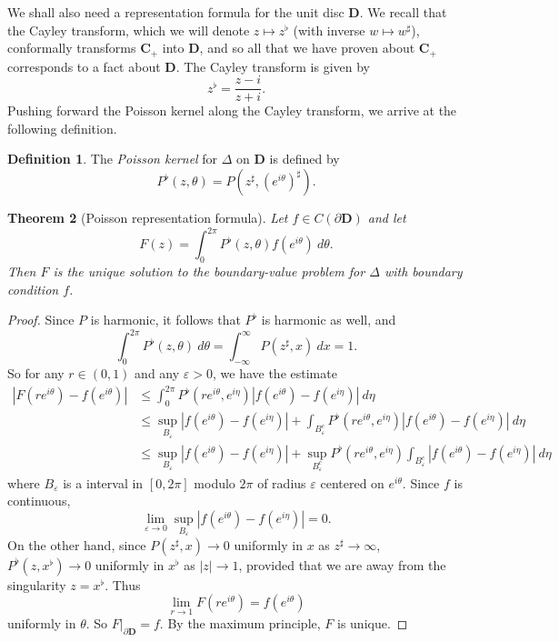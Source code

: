 \documentclass[12pt]{report}
\newcommand{\CC}{\mathbf{C}}
\newcommand{\DD}{\mathbf{D}}
\newcommand{\dfn}[1]{\emph{#1}\index{#1}}
\newtheorem{theorem}{Theorem}[chapter]
\theoremstyle{definition}
\newtheorem{definition}[theorem]{Definition}
\theoremstyle{remark}
\begin{document}
We shall also need a representation formula for the unit disc $\DD$. We recall that the Cayley transform, which we will denote $z \mapsto z^\flat$ (with inverse $w \mapsto w^\sharp$), conformally transforms $\CC_+$ into $\DD$, and so all that we have proven about $\CC_+$ corresponds to a fact about $\DD$. The Cayley transform is given by
$$z^\flat = \frac{z - i}{z + i}.$$
Pushing forward the Poisson kernel along the Cayley transform, we arrive at the following definition.
\begin{definition}
The \dfn{Poisson kernel} for $\Delta$ on $\DD$ is defined by
$$P^\flat(z, \theta) = P(z^\sharp, (e^{i\theta})^\sharp).$$
\end{definition}
\begin{theorem}[Poisson representation formula]
Let $f \in C(\partial \DD)$ and let
$$F(z) = \int_0^{2\pi} P^\flat(z, \theta)f(e^{i\theta}) ~d\theta.$$
Then $F$ is the unique solution to the boundary-value problem for $\Delta$ with boundary condition $f$.
\end{theorem}
\begin{proof}
Since $P$ is harmonic, it follows that $P^\flat$ is harmonic as well, and
$$\int_0^{2\pi} P^\flat(z, \theta) ~d\theta = \int_{-\infty}^\infty P(z^\sharp, x) ~dx = 1.$$
So for any $r \in (0, 1)$ and any $\varepsilon > 0$, we have the estimate
\begin{align*}
  |F(re^{i\theta}) - f(e^{i\theta})| &\leq \int_0^{2\pi} P^\flat(re^{i\theta}, e^{i\eta})|f(e^{i\theta}) - f(e^{i\eta})| ~d\eta\\
    &\leq \sup_{B_\varepsilon} |f(e^{i\theta}) - f(e^{i\eta})| + \int_{B_\varepsilon^c} P^\flat(re^{i\theta}, e^{i\eta})|f(e^{i\theta}) - f(e^{i\eta})| ~d\eta\\
    &\leq \sup_{B_\varepsilon} |f(e^{i\theta}) - f(e^{i\eta})| + \sup_{B_\varepsilon^c} P^\flat(re^{i\theta}, e^{i\eta}) \int_{B_\varepsilon^c} |f(e^{i\theta}) - f(e^{i\eta})| ~d\eta
\end{align*}
where $B_\varepsilon$ is a interval in $[0, 2\pi]$ modulo $2\pi$ of radius $\varepsilon$ centered on $e^{i\theta}$. Since $f$ is continuous,
$$\lim_{\varepsilon \to 0}\sup_{B_\varepsilon} |f(e^{i\theta}) - f(e^{i\eta})| = 0.$$
On the other hand, since $P(z^\sharp, x) \to 0$ uniformly in $x$ as $z^\sharp \to \infty$, $P^\flat(z, x^\flat) \to 0$ uniformly in $x^\flat$ as $|z| \to 1$, provided that we are away from the singularity $z = x^\flat$. Thus
$$\lim_{r \to 1} F(re^{i\theta}) = f(e^{i\theta})$$
uniformly in $\theta$. So $F|_{\partial \DD} = f$. By the maximum principle, $F$ is unique.
\end{proof}
\end{document}
